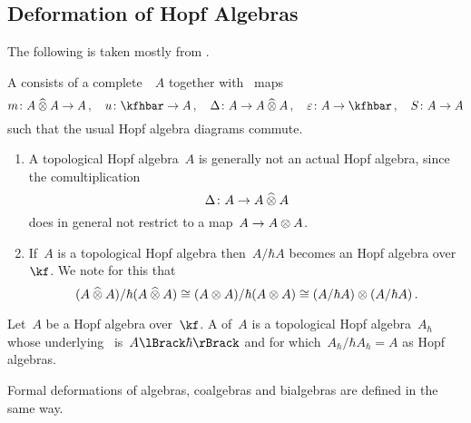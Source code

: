 \documentclass[a4paper, 11pt, oneside]{scrartcl}
\begin{document}



\subsection{Deformation of Hopf Algebras}

The following is taken mostly from \cite[Chapter~6]{guide_to_quantum_groups}.

\begin{definition}
  \label{topological definitions}
  A  consists of a complete~\module{$\kfhbar$}~$A$ together with~\linear{$\kfhbar$} maps
  \[
    m \colon A \ctensor A \to A \,,
    \quad
    u \colon \kfhbar \to A \,,
    \quad
    \Delta \colon A \to A \ctensor A \,,
    \quad
    \varepsilon \colon A \to \kfhbar \,,
    \quad
    S \colon A \to A
  \]
  such that the usual Hopf algebra diagrams commute.
\end{definition}

\begin{remark}
  \leavevmode
  \begin{enumerate}
    \item
      A topological Hopf algebra~$A$ is generally not an actual Hopf algebra, since the comultiplication
      \[
        \Delta
        \colon
        A
        \to
        A \mathbin{\widehat{\otimes}} A
      \]
      does in general not restrict to a map~$A \to A \otimes A$.
    \item
      If~$A$ is a topological Hopf algebra then~$A / \hbar A$ becomes an Hopf algebra over~$\kf$.
      We note for this that
      \[
        (A \mathbin{\widehat{\otimes}} A) / \hbar (A \mathbin{\widehat{\otimes}} A)
        \cong
        (A \otimes A) / \hbar (A \otimes A)
        \cong
        (A / \hbar A) \otimes (A / \hbar A) \,.
      \]
  \end{enumerate}
\end{remark}

\begin{definition}
  \label{definition of more general deformations}
  Let~$A$ be a Hopf algebra over~$\kf$.
  A  of~$A$ is a topological Hopf algebra~$A_{\hbar}$ whose underlying~\module{$\kfhbar$} is~$\power{A}{\hbar}$ and for which~$A_\hbar / \hbar A_\hbar = A$ as Hopf algebras.

  Formal deformations of algebras, coalgebras and bialgebras are defined in the same way.
\end{definition}
\end{document}
